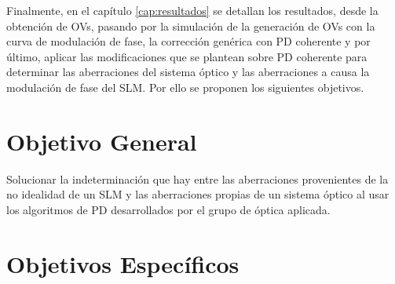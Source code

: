 Finalmente, en el capítulo \ref{cap:resultados} se detallan los resultados, desde la obtención de OVs, pasando por la simulación de la generación de OVs con la curva de modulación de fase, la corrección genérica con PD coherente y por último, aplicar las modificaciones que se plantean sobre PD coherente para determinar las aberraciones del sistema óptico y las aberraciones a causa la modulación de fase del SLM. Por ello se proponen los siguientes objetivos.

\section{Objetivo General}


Solucionar la indeterminación que hay entre las aberraciones provenientes de la no idealidad de un SLM y las aberraciones propias de un sistema óptico al usar los algoritmos de PD desarrollados por el grupo de óptica aplicada.









\section{Objetivos Específicos}

